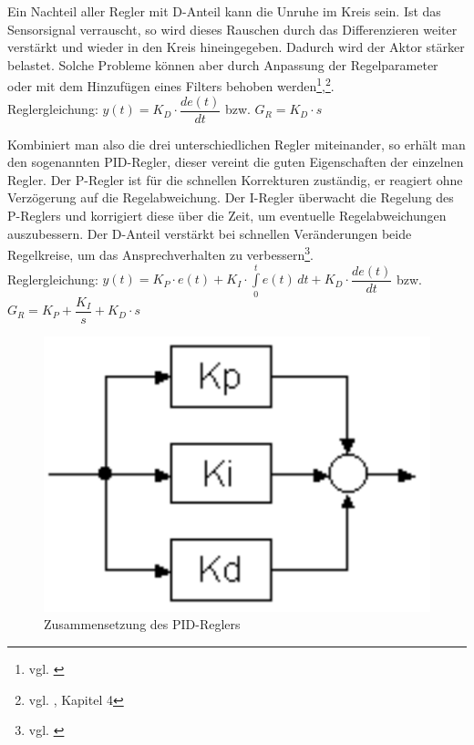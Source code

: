 Ein Nachteil aller Regler mit D-Anteil kann die Unruhe im Kreis sein. Ist das Sensorsignal verrauscht, so wird dieses Rauschen durch das Differenzieren weiter verstärkt und wieder in den Kreis hineingegeben. Dadurch wird der Aktor stärker belastet. Solche Probleme können aber durch Anpassung der Regelparameter oder mit dem Hinzufügen eines Filters behoben werden\footnote{vgl. \cite{PID-Regler}},\footnote{vgl. \cite{AUT5}, Kapitel 4}.
\\[4mm]
Reglergleichung: \hspace{7mm} $y(t) = K_D \cdot \dfrac{de(t)}{dt}$\hspace{5mm} bzw. \hspace{5mm} $G_R = K_D \cdot s$

\newpage

Kombiniert man also die drei unterschiedlichen Regler miteinander, so erhält man den sogenannten PID-Regler, dieser vereint die guten Eigenschaften der einzelnen Regler. Der P-Regler ist für die schnellen Korrekturen zuständig, er reagiert ohne Verzögerung auf die Regelabweichung. Der I-Regler überwacht die Regelung des P-Reglers und korrigiert diese über die Zeit, um eventuelle Regelabweichungen auszubessern. Der D-Anteil verstärkt bei schnellen Veränderungen beide Regelkreise, um das Ansprechverhalten zu verbessern\footnote{vgl. \cite{PID-Regler}}.
\\[4mm]
Reglergleichung: \hspace{3mm} $y(t) = K_P \cdot e(t) + K_I \cdot \int\limits_{0}^{t} e(t) \,dt + K_D \cdot \dfrac{de(t)}{dt}$ \hspace{3mm} bzw. \hspace{3mm} $G_R = K_P + \dfrac{K_I}{s} + K_D \cdot s$
\\[5mm]
\begin{figure}[H]
	\begin{center}
		\includegraphics[scale=0.15]{figures/antrieb/PID_Regler.png}
		\caption{Zusammensetzung des PID-Reglers \cite{Regelungstechnik}}
	\end{center}
\end{figure}

